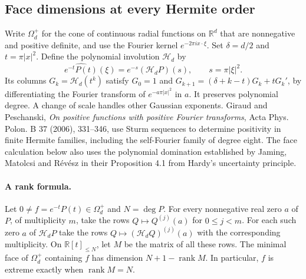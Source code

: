 \documentclass[11pt,a4paper]{article}
\numberwithin{equation}{section}
\begin{document}
\subsection{Face dimensions at every Hermite order}
Write $\Omega_d^+$ for the cone of continuous radial functions on
$\mathbb R^d$ that are nonnegative and positive definite, and use the
Fourier kernel $e^{-2\pi i x\cdot\xi}$. Set $\delta=d/2$ and
$t=\pi|x|^2$. Define the polynomial involution $\mathcal H_d$ by
\[
 \widehat{e^{-t}P(t)}(\xi)=e^{-s}(\mathcal H_dP)(s),\qquad
 s=\pi|\xi|^2 .
\]
Its columns $G_k=\mathcal H_d(t^k)$ satisfy
$G_0=1$ and $G_{k+1}=(\delta+k-t)G_k+tG_k'$, by differentiating the
Fourier transform of $e^{-a\pi|x|^2}$ in $a$. It preserves polynomial
degree. A change of scale handles other Gaussian exponents.
Giraud and Peschanski, \emph{On positive functions with positive Fourier
transforms}, Acta Phys. Polon. B 37 (2006), 331--346, use Sturm sequences
to determine positivity in finite Hermite families, including the
self-Fourier family of degree eight. The face calculation below also uses
the polynomial domination established by Jaming, Matolcsi and R\'ev\'esz
in their Proposition 4.1 from Hardy's uncertainty principle.

\paragraph{A rank formula.}
Let $0\ne f=e^{-t}P(t)\in\Omega_d^+$ and $N=\deg P$. For every
nonnegative real zero $a$ of $P$, of multiplicity $m$, take the rows
$Q\mapsto Q^{(j)}(a)$ for $0\le j<m$. For each such zero $a$ of
$\mathcal H_dP$ take the rows $Q\mapsto(\mathcal H_dQ)^{(j)}(a)$
with the corresponding multiplicity. On $\mathbb R[t]_{\le N}$, let
$M$ be the matrix of all these rows. The minimal face of $\Omega_d^+$
containing $f$ has dimension $N+1-\operatorname{rank}M$.
In particular, $f$ is extreme exactly when $\operatorname{rank}M=N$.
\end{document}

